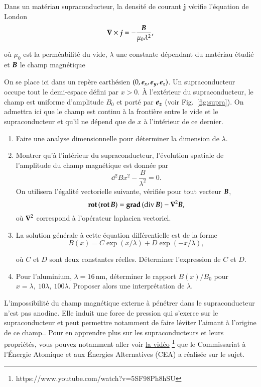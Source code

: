 \begin{exocor}
	Dans un matériau supraconducteur, la densité de courant $\mathbf{j}$ 
	vérifie l'équation de London 
\begin{equation*}
	\grad \times \vecj = -\frac{\vecb}{\mu_0 \lambda^2},
\end{equation*} 

où $\mu_0$ est la perméabilité du vide, $\lambda$ une constante dépendant du 
matériau étudié et $\vecb$ le champ magnétique

On se place ici dans un repère carthésien $(0,\ex,\ey,\ez)$. 
Un supraconducteur occupe tout le demi-espace défini par $x > 0$.
À l'extérieur du supraconducteur, le champ est uniforme d'amplitude $B_0$ et 
porté par $\ez$ (voir Fig.~\ref{fig:supra}).
On admettra ici que le champ est continu à la frontière entre le vide et le 
supraconducteur et qu'il ne dépend que de $x$ à l'intérieur de ce dernier.

\begin{enumerate}
	\item Faire une analyse dimensionnelle pour déterminer la dimension de $\lambda$.
	\item Montrer qu'à l'intérieur du supraconducteur, 
	  l'évolution spatiale de l'amplitude du  champ magnétique est donnée par 
		\begin{equation*}
			\dd{^2B}{x^2} - \frac{B}{\lambda^2} = 0.
		\end{equation*}
	On utilisera l'égalité vectorielle suivante, vérifiée pour tout 
	vecteur $\vecb$,
	\begin{equation*} 
		\rot(\rot \vecb) = \gradient(\div\vecb) - \laplacien \vecb,
	\end{equation*}
	où $\laplacien$ correspond à l'opérateur laplacien vectoriel.
	\item La solution générale à cette équation différentielle est de la forme 
\begin{equation}
	B(x) = C \exp(x/\lambda) + D \exp(-x/\lambda),
\end{equation}

où $C$ et $D$ sont deux constantes réelles.
Déterminer l'expression de $C$ et $D$.

\item Pour l'aluminium, $\lambda = 16$\,nm, déterminer le rapport $B(x)/B_0$ pour $x = \lambda,\ 10\lambda,\ 100\lambda$. Proposer alors une interprétation de $\lambda$.
\end{enumerate}

L'impossibilité du champ magnétique externe à pénétrer dans le supraconducteur n'est pas anodine.
Elle induit une force de pression qui s'exerce sur le supraconducteur et peut permettre notamment de faire léviter l'aimant à l'origine de ce champ.. 
Pour en apprendre plus sur les supraconducteurs et leurs propriétés, 
vous pouvez notamment aller voir 
\href{https://www.youtube.com/watch?v=5SF98Ph8hSU}{la vidéo}
\footnote{https://www.youtube.com/watch?v=5SF98Ph8hSU} que 
le Commissariat à l'Énergie Atomique et aux Énergies Alternatives (CEA) a réalisée 
sur le sujet.
\end{exocor}

